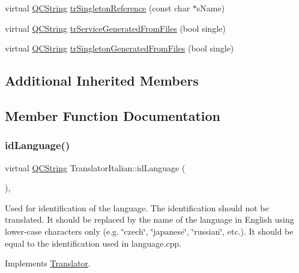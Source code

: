 \begin{DoxyCompactItemize}
\item 
virtual \mbox{\hyperlink{class_q_c_string}{Q\+C\+String}} \mbox{\hyperlink{class_translator_italian_a9ed6b35c66e878d43fcd587e204a3b9b}{tr\+Singleton\+Reference}} (const char $\ast$s\+Name)
\item 
virtual \mbox{\hyperlink{class_q_c_string}{Q\+C\+String}} \mbox{\hyperlink{class_translator_italian_aa464887e12556d927937937e9f4df7b6}{tr\+Service\+Generated\+From\+Files}} (bool single)
\item 
virtual \mbox{\hyperlink{class_q_c_string}{Q\+C\+String}} \mbox{\hyperlink{class_translator_italian_a645bb1ff600b52842533554995f64f00}{tr\+Singleton\+Generated\+From\+Files}} (bool single)
\end{DoxyCompactItemize}
\subsection*{Additional Inherited Members}


\subsection{Member Function Documentation}
\mbox{\label{class_translator_italian_a03fa97515ddfa1510cafc3a6070bd798}} 
\subsubsection{\texorpdfstring{idLanguage()}{idLanguage()}}
{\footnotesize\ttfamily virtual \mbox{\hyperlink{class_q_c_string}{Q\+C\+String}} Translator\+Italian\+::id\+Language (\begin{DoxyParamCaption}{ }\end{DoxyParamCaption})\hspace{0.3cm}{\ttfamily [inline]}, {\ttfamily [virtual]}}

Used for identification of the language. The identification should not be translated. It should be replaced by the name of the language in English using lower-\/case characters only (e.\+g. \char`\"{}czech\char`\"{}, \char`\"{}japanese\char`\"{}, \char`\"{}russian\char`\"{}, etc.). It should be equal to the identification used in language.\+cpp. 

Implements \mbox{\hyperlink{class_translator}{Translator}}.

